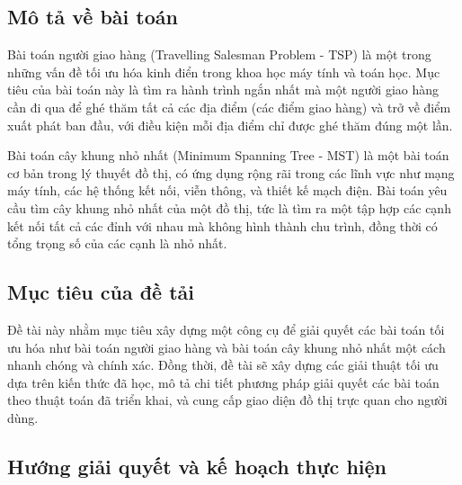 {}
\setcounter{section}{1}

\subsection{Mô tả về bài toán}
Bài toán người giao hàng (Travelling Salesman Problem - TSP) là một trong những vấn đề tối ưu hóa kinh điển trong khoa học máy tính và toán học. Mục tiêu của bài toán này là tìm ra hành trình ngắn nhất mà một người giao hàng cần đi qua để ghé thăm tất cả các địa điểm (các điểm giao hàng) và trở về điểm xuất phát ban đầu, với điều kiện mỗi địa điểm chỉ được ghé thăm đúng một lần.

Bài toán cây khung nhỏ nhất (Minimum Spanning Tree - MST) là một bài toán cơ bản trong lý thuyết đồ thị, có ứng dụng rộng rãi trong các lĩnh vực như mạng máy tính, các hệ thống kết nối, viễn thông, và thiết kế mạch điện. Bài toán yêu cầu tìm cây khung nhỏ nhất của một đồ thị, tức là tìm ra một tập hợp các cạnh kết nối tất cả các đỉnh với nhau mà không hình thành chu trình, đồng thời có tổng trọng số của các cạnh là nhỏ nhất.

\subsection{Mục tiêu của đề tải}
Đề tài này nhằm mục tiêu xây dựng một công cụ để giải quyết các bài toán tối ưu hóa như bài toán người giao hàng và bài toán cây khung nhỏ nhất một cách nhanh chóng và chính xác. Đồng thời, đề tài sẽ xây dựng các giải thuật tối ưu dựa trên kiến thức đã học, mô tả chi tiết phương pháp giải quyết các bài toán theo thuật toán đã triển khai, và cung cấp giao diện đồ thị trực quan cho người dùng.

\subsection{Hướng giải quyết và kế hoạch thực hiện}
